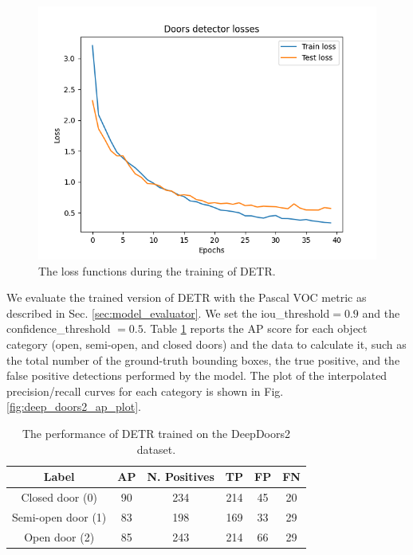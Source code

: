 \begin{figure}[h!]
	\centering
	\includegraphics[width=\linewidth]{images/deep_doors_2_loss.png}
	\caption{The loss functions during the training of DETR.}
	\label{fig:deep_doors2_loss}
\end{figure}

We evaluate the trained version of DETR with the Pascal VOC metric \cite{pascal} as described in Sec. \ref{sec:model_evaluator}. We set the \textsf{iou\_threshold}$ = 0.9$ and the \textsf{confidence\_threshold} $= 0.5$. Table \ref{tab:deep_doors2_results} reports the AP score for each object category (open, semi-open, and closed doors) and the data to calculate it, such as the total number of the ground-truth bounding boxes, the true positive, and the false positive detections performed by the model. The plot of the interpolated precision/recall curves for each category is shown in Fig. \ref{fig:deep_doors2_ap_plot}.

\begin{table}[h!]
	\centering
	\begin{tabular}{cccccc}
		
		\toprule
		\textbf{Label} & \textbf{AP} & \textbf{N. Positives} & \textbf{TP} & \textbf{FP} & \textbf{FN}\tabularnewline
		\midrule
		Closed door (0) & 90 & 234 & 214 & 45 & 20 \tabularnewline
		Semi-open door (1) & 83 & 198 & 169 & 33 & 29 \tabularnewline
		Open door (2) & 85 & 243 & 214 & 66 & 29 \tabularnewline
		\bottomrule
	\end{tabular}
	\caption{The performance of DETR trained on the DeepDoors2 dataset.}
	\label{tab:deep_doors2_results}
\end{table}

